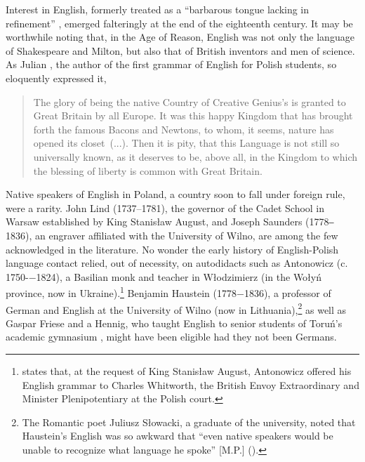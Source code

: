 \documentclass[output=paper,colorlinks,citecolor=brown,arabicfont,chinesefont]{langscibook}
\begin{document}
Interest in English, formerly treated as a “barbarous tongue lacking in refinement” \citep[121]{Ciesla_michal1974}, emerged falteringly at the end of the eighteenth century. It may be worthwhile noting that, in the Age of Reason, English was not only the language of Shakespeare and Milton, but also that of British inventors and men of science. As Julian \citet{Antonowicz1788}, the author of the first grammar of English for Polish students, so eloquently expressed it,

\begin{quote}
    The glory of being the native Country of Creative Genius’s is granted to Great Britain by all Europe. It was this happy Kingdom that has brought forth the famous Bacons and Newtons, to whom, it seems, nature has opened its closet~(...). Then it is pity, that this Language is not still so universally known, as it deserves  to be, above all, in the Kingdom to which the blessing of liberty is common with Great Britain.
\end{quote}

Native speakers of English in Poland, a country soon to fall under foreign rule, were a rarity. John Lind (1737--1781), the governor of the Cadet School in Warsaw established by King Stanisław August, and Joseph Saunders (1778‒1836), an engraver affiliated with the University of Wilno, are among the few acknowledged in the literature. No wonder the early history of English-Polish language contact relied, out of necessity, on autodidacts such as Antonowicz (c. 1750-−1824), a Basilian monk and teacher in Włodzimierz (in the Wołyń province, now in Ukraine).\footnote {\citet[175]{Butterwick_richard1998} states that, at the request of King Stanisław August, Antonowicz offered his English grammar to Charles Whitworth, the British Envoy Extraordinary and Minister Plenipotentiary at the Polish court.} Benjamin Haustein (1778−1836), a professor of German and English at the University of Wilno (now in Lithuania),\footnote{The Romantic poet Juliusz Słowacki, a graduate of the university, noted that Haustein’s English was so awkward that “even native speakers would be unable to recognize what language he spoke” [M.P.] (\citealt[96]{Piechota_marek2016}).} as well as Gaspar Friese and a Hennig, who taught English to senior students of Toruń’s academic gymnasium \citep[408]{Lukaszewicz_jozef1849}, might have been eligible had they not been Germans.
\end{document}
